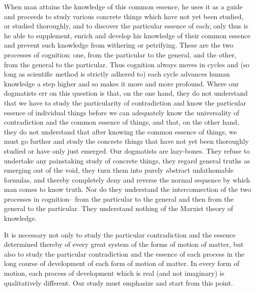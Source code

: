 \documentclass{article}
\begin{document}
When man attains the knowledge of this common essence, he uses it as a guide
and proceeds to study various concrete things which have not yet been studied,
or studied thoroughly, and to discover the particular essence of each; only
thus is he able to supplement, enrich and develop his knowledge of their common
essence and prevent such knowledge from withering or petrifying. These are the
two processes of cognition: one, from the particular to the general, and the
other, from the general to the particular. Thus cognition always moves in
cycles and (so long as scientific method is strictly adhered to) each cycle
advances human knowledge a step higher and so makes it more and more profound.
Where our dogmatists err on this question is that, on the one hand, they do not
understand that we have to study the particularity of contradiction and know
the particular essence of individual things before we can adequately know the
universality of contradiction and the common essence of things, and that, on
the other hand, they do not understand that after knowing the common essence of
things, we must go further and study the concrete things that have not yet been
thoroughly studied or have only just emerged. Our dogmatists are lazy-bones.
They refuse to undertake any painstaking study of concrete things, they regard
general truths as emerging out of the void, they turn them into purely abstract
unfathomable formulas, and thereby completely deny and reverse the normal
sequence by which man comes to know truth. Nor do they understand the
interconnection of the two processes in cognition-- from the particular to the
general and then from the general to the particular. They understand nothing of
the Marxist theory of knowledge.

It is necessary not only to study the particular contradiction and the essence
determined thereby of every great system of the forms of motion of matter, but
also to study the particular contradiction and the essence of each process in
the long course of development of each form of motion of matter. In every form
of motion, each process of development which is real (and not imaginary) is
qualitatively different. Our study must emphasize and start from this point.
\end{document}
